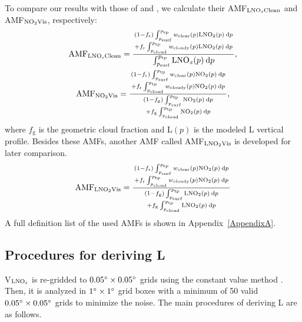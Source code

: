 \documentclass[amt]{copernicus}
\begin{document}
To compare our results with those of \citet{Pickering.2016} and \citet{Lapierre.2020}, we calculate their AMF$_{\chem{LNO_\mathit{x}}\mathrm{Clean}}$ and AMF$_{\chem{NO_2}\mathrm{Vis}}$, respectively:
\begin{gather}
\mathrm{AMF}_{\chem{LNO_\mathit{x}}\mathrm{Clean}} = \displaystyle{{(1-f_\mathrm{r}) \int_{p_{\mathrm{surf}}}^{p_{\mathrm{tp}}} w_\mathrm{{clear}}(p) \chem{LNO_2}(p) \: \mathrm{d}p \atop + f_\mathrm{r} \int_{p_\mathrm{{cloud}}}^{p_{\mathrm{tp}}} w_{\mathrm{cloudy}}(p) \chem{LNO_2}(p) \: \mathrm{d}p}\over{\int_{p_{\mathrm{surf}}}^{p_{\mathrm{tp}}} \chem{LNO_\mathit{x}}(p) \: \mathrm{d}p}},\\
\mathrm{AMF}_{\chem{NO_2}\mathrm{Vis}} = \displaystyle{{(1-f_\mathrm{r}) \int_{p_{\mathrm{surf}}}^{p_{\mathrm{tp}}} w_\mathrm{{clear}}(p) \chem{NO_2}(p) \: \mathrm{d}p \atop+ f_\mathrm{r} \int_{p_\mathrm{{cloud}}}^{p_{\mathrm{tp}}} w_{\mathrm{cloudy}}(p) \chem{NO_2}(p) \: \mathrm{d}p}\over{(1-f_\mathrm{g}) \int_{p_{\mathrm{surf}}}^{p_{\mathrm{tp}}} \chem{NO_2}(p) \: \mathrm{d}p \atop+ f_\mathrm{g} \int_{p_\mathrm{{cloud}}}^{p_{\mathrm{tp}}} \chem{NO_2}(p) \: \mathrm{d}p}},
\end{gather}
where $f_\mathrm{g}$ is the geometric cloud fraction and L$(p)$ is the modeled L vertical profile.
Besides these AMFs, another AMF called AMF$_{\chem{LNO_2}\mathrm{Vis}}$ is developed for later comparison.
\begin{equation}
\mathrm{AMF}_{\chem{LNO_2}\mathrm{Vis}} = \displaystyle{{(1-f_\mathrm{r}) \int_{p_{\mathrm{surf}}}^{p_{\mathrm{tp}}} w_\mathrm{{clear}}(p) \chem{NO_2}(p) \: \mathrm{d}p \atop+ f_\mathrm{r} \int_{p_\mathrm{{cloud}}}^{p_{\mathrm{tp}}} w_{\mathrm{cloudy}}(p) \chem{NO_2}(p) \: \mathrm{d}p}\over{(1-f_\mathrm{g}) \int_{p_{\mathrm{surf}}}^{p_{\mathrm{tp}}} \chem{LNO_2}(p) \: \mathrm{d}p\atop + f_\mathrm{g} \int_{p_\mathrm{{cloud}}}^{p_{\mathrm{tp}}} \chem{LNO_2}(p) \: \mathrm{d}p}}
\end{equation}
A full definition list of the used AMFs is shown in Appendix~\ref{AppendixA}.

\subsection{Procedures for deriving L} \label{section:Conditions}

V$_\chem{LNO_\mathit{x}}$ is re-gridded to $0.05{^{\circ}}\times 0.05{^{\circ}}$ grids using the constant value method \citep{Kuhlmann.2014}.
Then, it is analyzed in $1{^{\circ}}\times 1{^{\circ}}$ grid boxes with a minimum of 50 valid $0.05{^{\circ}}\times 0.05{^{\circ}}$ grids to minimize the noise.
The main procedures of deriving L are as follows.
\end{document}
